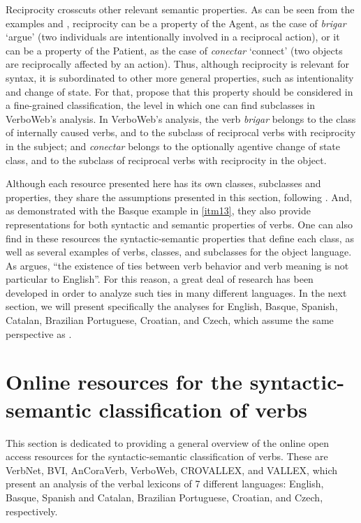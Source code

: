 \documentclass[english]{textolivre}
\begin{document}
Reciprocity crosscuts other relevant semantic properties. As can be seen from the examples  and , reciprocity can be a property of the Agent, as the case of \textit{brigar} ‘argue’ (two individuals are intentionally involved in a reciprocal action), or it can be a property of the Patient, as the case of \textit{conectar} ‘connect’ (two objects are reciprocally affected by an action). Thus, although reciprocity is relevant for syntax, it is subordinated to other more general properties, such as intentionality and change of state. For that, \textcite{wetzels_lexical_2016} propose that this property should be considered in a fine-grained classification, the level in which one can find subclasses in VerboWeb’s analysis. In VerboWeb’s analysis, the verb \textit{brigar} belongs to the class of internally caused verbs, and to the subclass of reciprocal verbs with reciprocity in the subject; and \textit{conectar} belongs to the optionally agentive change of state class, and to the subclass of reciprocal verbs with reciprocity in the object.

Although each resource presented here has its own classes, subclasses and properties, they share the assumptions presented in this section, following \textcite{levin_english_1993}. And, as demonstrated with the Basque example in \ref{itm13}, they also provide representations for both syntactic and semantic properties of verbs. One can also find in these resources the syntactic-semantic properties that define each class, as well as several examples of verbs, classes, and subclasses for the object language. As \textcite[p.~10]{levin_english_1993} argues, “the existence of ties between verb behavior and verb meaning is not particular to English”. For this reason, a great deal of research has been developed in order to analyze such ties in many different languages. In the next section, we will present specifically the analyses for English, Basque, Spanish, Catalan, Brazilian Portuguese, Croatian, and Czech, which assume the same perspective as \textcite{levin_english_1993}.

\section{Online resources for the syntactic-semantic classification of verbs}\label{Section3}

This section is dedicated to providing a general overview of the online open access resources for the syntactic-semantic classification of verbs. These are VerbNet, BVI, AnCoraVerb, VerboWeb, CROVALLEX, and VALLEX, which present an analysis of the verbal lexicons of 7 different languages: English, Basque, Spanish and Catalan, Brazilian Portuguese, Croatian, and Czech, respectively. 
\end{document}
